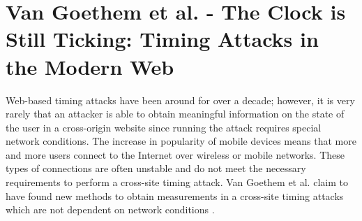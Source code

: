 \documentclass[10pt,a4paper,twoside]{book}
\begin{document}
%
%

\section{Van Goethem et al. - The Clock is Still Ticking: Timing Attacks in the Modern Web}

Web-based timing attacks have been around for over a decade; however, it is very rarely that an attacker is able to obtain meaningful information on the state of the user in a cross-origin website since running the attack requires special network conditions. The increase in popularity of mobile devices means that more and more users connect to the Internet over wireless or mobile networks. These types of connections are often unstable and do not meet the necessary requirements to perform a cross-site timing attack. Van Goethem et al. claim to have found new methods to obtain measurements in a cross-site timing attacks which are not dependent on network conditions \cite{van2015clock}.
\end{document}
